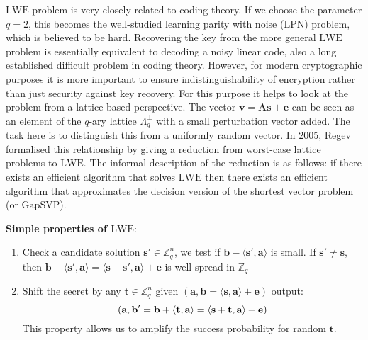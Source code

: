 $\mathrm{LWE}$ problem is very closely related to coding theory. If we choose the parameter $q = 2$, this becomes the well-studied learning parity with noise ($\mathrm{LPN}$) problem, which is believed to be hard. Recovering the key from the more general $\mathrm{LWE}$ problem is essentially equivalent to decoding a noisy linear code, also a long established difficult problem in coding theory. However, for modern cryptographic purposes it is more important to ensure indistinguishability of encryption rather than just security against key recovery. For this purpose it helps to look at the problem from a lattice-based perspective. The vector $\textbf{v} = \textbf{A}\textbf{s} + \textbf{e}$ can be seen as an element of the $q$-ary lattice $\Lambda_q^{\perp}$ with a small perturbation vector added. The task here is to distinguish this from a uniformly random vector. In 2005, Regev \cite{Regev:2005:LLE:1060590.1060603} formalised this relationship by giving a reduction from worst-case lattice problems to $\mathrm{LWE}$. The informal description of the reduction is as follows: if there exists an efficient algorithm that solves $\mathrm{LWE}$ then there exists an efficient algorithm that approximates the decision version of the shortest vector problem (or $\mathrm{GapSVP}$).


\textbf{Simple properties of $\mathrm{LWE}:$}
\begin{enumerate}
    \item Check a candidate solution $\textbf{s}' \in \mathbb{Z}_{q}^{n}$, we test if $\textbf{b} - \langle \textbf{s}', \textbf{a}\rangle$ is small. If $\textbf{s}' \neq \textbf{s}$, then $\textbf{b} - \langle \textbf{s}', \textbf{a}\rangle = \langle \textbf{s} - \textbf{s}', \textbf{a} \rangle + \textbf{e}$ is well spread in $\mathbb{Z}_{q}$
    \item Shift the secret by any $\textbf{t} \in \mathbb{Z}_{q}^{n}$ given $(\textbf{a}, \textbf{b} = \langle \textbf{s}, \textbf{a} \rangle + \textbf{e})$ output:
    \begin{equation}
    \centering
    (\textbf{a}, \textbf{b}' = \textbf{b} + \langle \textbf{t}, \textbf{a} \rangle = \langle \textbf{s} + \textbf{t}, \textbf{a} \rangle + \textbf{e})
    \end{equation}
    This property allows us to amplify the success probability for random $\textbf{t}$. 
\end{enumerate}

